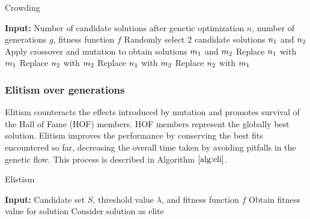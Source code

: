 \documentclass[conference]{IEEEtran}
\theoremstyle{definition}
\begin{document}
\begin{algorithm}[t]
\scriptsize
\caption{Crowding}
\label{alg:crowd}
\begin{algorithmic}[1]
\STATE \textbf{Input:} Number of candidate solutions after genetic optimization $\textit{n}$, number of generations $\textit{g}$, fitness function $\textit{f}$
\STATE Randomly select 2 candidate solutions $n\textsubscript{1}$ and $n\textsubscript{2}$
\STATE Apply crossover and mutation to obtain solutions $m\textsubscript{1}$ and $m\textsubscript{2}$
\STATE Replace $n\textsubscript{1}$ with $m\textsubscript{1}$
\ENDIF
{}
\STATE Replace $n\textsubscript{2}$ with $m\textsubscript{2}$
\ENDIF
\ELSE
{}
\STATE Replace $n\textsubscript{1}$ with $m\textsubscript{2}$
\ENDIF
{}
\STATE Replace $n\textsubscript{2}$ with $m\textsubscript{1}$
\ENDIF
\ENDIF
\ENDWHILE
\ENDFOR
\end{algorithmic}
\end{algorithm}

\subsubsection{Elitism over generations}

Elitism counteracts the effects introduced by mutation and promotes survival of the Hall of Fame (HOF) members. HOF members represent the globally best solution. Elitism improves the performance by conserving the best fits encountered so far, decreasing the overall time taken by avoiding pitfalls in the genetic flow. This process is described in Algorithm $\ref{alg:eli}$.

\begin{algorithm}[t]
\scriptsize
\caption{Elistism}
\label{alg:eli}
\begin{algorithmic}[1]
\STATE \textbf{Input:} Candidate set $\textit{S}$, threshold value $\lambda$, and fitness function $\textit{f}$
\STATE Obtain fitness value for solution
\STATE Consider solution as elite
\ENDIF
\ENDFOR
\end{algorithmic}
\end{algorithm}
\end{document}
